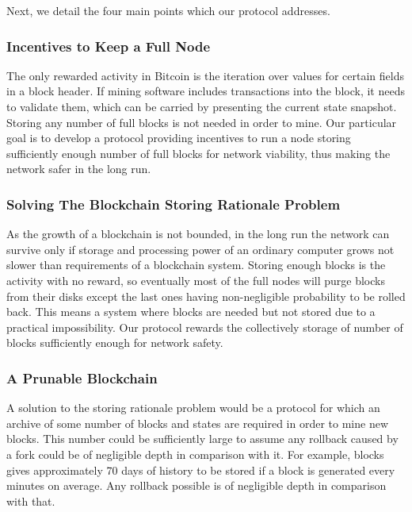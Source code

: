 \documentclass[conference,compsoc]{IEEEtran}
\begin{document}
Next, we detail the four main points which our protocol addresses.

\subsubsection{Incentives to Keep a Full Node}

 The only rewarded activity in Bitcoin is the iteration over values for certain fields in a block header. If mining software includes transactions into the block, it needs to validate them, which can be carried by presenting the current state snapshot. Storing any number of full blocks is not needed in order to mine. Our particular goal is to develop a protocol providing incentives to run a node storing sufficiently enough number of full blocks for network viability, thus making the network safer in the long run. 

\subsubsection{Solving The Blockchain Storing Rationale Problem}

As the growth of a blockchain is not bounded, in the long run the network can survive only if storage and processing power of an ordinary computer grows not slower than requirements of a blockchain system. Storing enough blocks is the activity with no reward, so eventually most of the full nodes will purge blocks from their disks except the last ones having non-negligible probability to be rolled back. This means a system where blocks are needed but not stored due to a practical impossibility. Our protocol rewards the collectively storage of number of blocks sufficiently enough for network safety. 

\subsubsection{A Prunable Blockchain}

A solution to the storing rationale problem would be a protocol for which an archive of some number of blocks and states are required in order to mine new blocks. This number  could be sufficiently large to assume any rollback caused by a fork could be of negligible depth in comparison with it. For example,  blocks gives approximately 70 days of history to be stored if a block is generated every  minutes on average. Any rollback possible is of negligible depth in comparison with that. 
\end{document}
